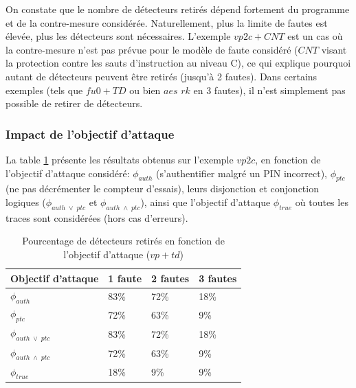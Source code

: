                 On constate que le nombre de détecteurs retirés dépend fortement du programme et de la contre-mesure considérée. Naturellement, plus la limite de fautes est élevée, plus les détecteurs sont nécessaires.
                L'exemple $vp2c + CNT$ est un cas où la contre-mesure n'est pas prévue pour le modèle de faute considéré ($CNT$ visant la protection contre les sauts d'instruction au niveau C), ce qui explique pourquoi autant de détecteurs peuvent être retirés (jusqu'à 2 fautes).
                Dans certains exemples (tels que $fu0 + TD$ ou bien $aes$ $rk$ en 3 fautes), il n'est simplement pas possible de retirer de détecteurs.
                
            \subsubsection{Impact de l'objectif d'attaque}
            \label{sec:ch6:exp:phi}
        
                La table \ref{tbl:ch6:exp:vp-td-phi} présente les résultats obtenus sur l'exemple $vp2c$, en fonction de l'objectif d'attaque considéré: $\phi_{auth}$ (s'authentifier malgré un PIN incorrect), $\phi_{ptc}$ (ne pas décrémenter le compteur d'essais), leurs disjonction et conjonction logiques ($\phi_{auth\; \vee \;ptc}$ et $\phi_{auth\; \wedge \;ptc}$), ainsi que l'objectif d'attaque $\phi_{true}$ où toutes les traces sont considérées (hors cas d'erreurs).

                \begin{table}[htbp]
                \caption{Pourcentage de détecteurs retirés en fonction de l'objectif d'attaque ($vp+td$)}\label{tbl:ch6:exp:vp-td-phi}
                \begin{center}
                    \begin{tabular}{l|lll}
                    Objectif d'attaque      & 1 faute & 2 fautes & 3 fautes \\
                    \hline
                    \hline
                    $\phi_{auth}$           & 83\%    & 72\%     & 18\%     \\
                    $\phi_{ptc}$            & 72\%    & 63\%     & 9\%      \\
                    $\phi_{auth\; \vee \;ptc}$  & 83\%    & 72\%     & 18\%     \\
                    $\phi_{auth\; \wedge \;ptc}$ & 72\%    & 63\%     & 9\%      \\
                    $\phi_{true}$           & 18\%    & 9\%      & 9\%     
                    \end{tabular}
                \end{center}
                \end{table} 
                
